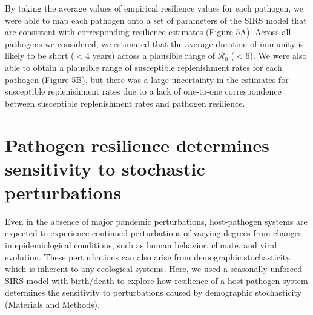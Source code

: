 \documentclass[12pt]{article}
\begin{document}
By taking the average values of empirical resilience values for each pathogen, we were able to map each pathogen onto a set of parameters of the SIRS model that are consistent with corresponding resilience estimates (Figure 5A).
Across all pathogens we considered, we estimated that the average duration of immunity is likely to be short ($<4$ years) across a plausible range of $\mathcal R_0$ ($<6$).
We were also able to obtain a plausible range of susceptible replenishment rates for each pathogen (Figure 5B), but there was a large uncertainty in the estimates for susceptible replenishment rates due to a lack of one-to-one correspondence between susceptible replenishment rates and pathogen resilience.

\section*{Pathogen resilience determines sensitivity to stochastic perturbations}

Even in the absence of major pandemic perturbations, host-pathogen systems are expected to experience continued perturbations of varying degrees from changes in epidemiological conditions, such as human behavior, climate, and viral evolution.
These perturbations can also arise from demographic stochasticity, which is inherent to any ecological systems.
Here, we used a seasonally unforced SIRS model with birth/death to explore how resilience of a host-pathogen system determines the sensitivity to perturbations caused by demographic stochasticity (Materials and Methods).
\end{document}
